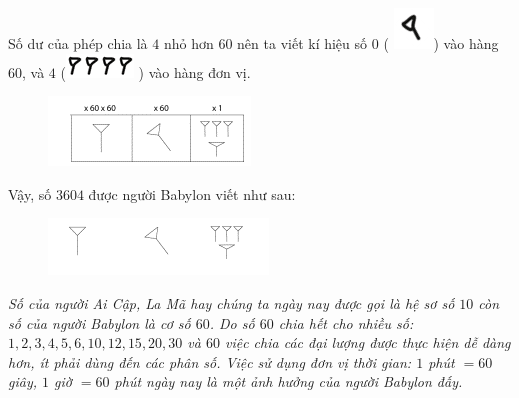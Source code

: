 	Số dư của phép chia là $4$ nhỏ hơn $60$ nên ta viết kí hiệu số $0$ ( \includegraphics{15.1}) vào hàng $60$, và $4$ (\includegraphics{15}\includegraphics{15}\includegraphics{15}\includegraphics{15}    ) vào hàng đơn vị. 
	\begin{figure}[H]
		\centering
		\vspace*{-5pt}
		\captionsetup{labelformat= empty, justification=centering}
		\includegraphics[width=0.4\linewidth]{26}
		\vspace*{-10pt}
	\end{figure}
	Vậy, số $3604$ được người Babylon viết như sau:
	\begin{figure}[H]
		\centering
		\vspace*{-5pt}
		\captionsetup{labelformat= empty, justification=centering}
		\includegraphics[width=0.4\linewidth]{27}
		\vspace*{-10pt}
	\end{figure}
	\textit{Số của người Ai Cập, La Mã hay chúng ta ngày nay được gọi là hệ sơ số $10$ còn số của người Babylon là cơ số $60$. Do số $60$ chia hết cho nhiều số: $1,2,3,4,5,6, 10, 12, 15, 20,30$ và $60$ việc chia các đại lượng được thực hiện dễ dàng hơn, ít phải dùng đến các phân số. Việc sử dụng đơn vị thời gian: $1$ phút $= 60$ giây, $1$ giờ $= 60$ phút ngày nay là một ảnh hưởng của người Babylon đấy.}
